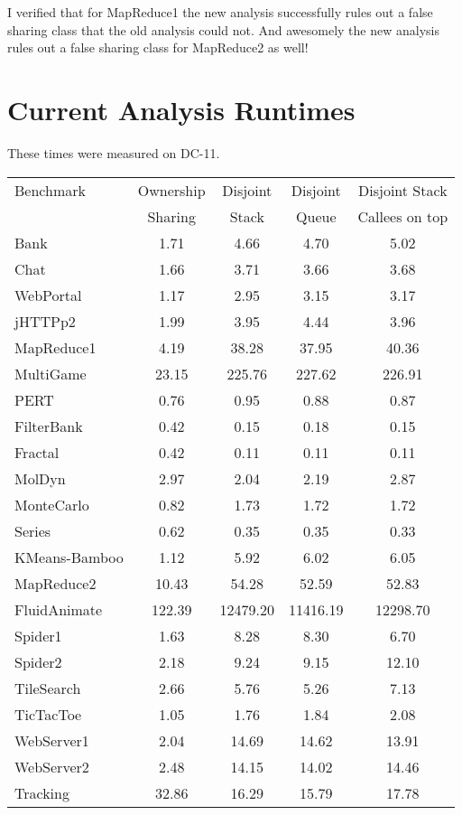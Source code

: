 \documentclass{amsart}[9pt]
\begin{document}
I verified that for MapReduce1 the new analysis successfully rules out
a false sharing class that the old analysis could not.  And awesomely
the new analysis rules out a false sharing class for MapReduce2 as
well!


\newpage

\section{Current Analysis Runtimes}
These times were measured on DC-11.

\begin{tabular}{|l|c|c|c|c|}
\hline
Benchmark     & Ownership & Disjoint & Disjoint & Disjoint Stack \\
              & Sharing   & Stack    & Queue    & Callees on top \\
\hline
Bank          &  1.71   & 4.66     & 4.70     &  5.02           \\
Chat          &  1.66   & 3.71     & 3.66     &  3.68           \\
WebPortal     &  1.17   & 2.95     & 3.15     &  3.17           \\
jHTTPp2       &  1.99   & 3.95     & 4.44     &  3.96           \\
MapReduce1    &  4.19   & 38.28    & 37.95    &  40.36          \\
MultiGame     &  23.15  & 225.76   & 227.62   &  226.91         \\
PERT          &  0.76   & 0.95     & 0.88     &  0.87           \\
FilterBank    &  0.42   & 0.15     & 0.18     &  0.15           \\
Fractal       &  0.42   & 0.11     & 0.11     &  0.11           \\
MolDyn        &  2.97   & 2.04     & 2.19     &  2.87           \\
MonteCarlo    &  0.82   & 1.73     & 1.72     &  1.72           \\
Series        &  0.62   & 0.35     & 0.35     &  0.33           \\
KMeans-Bamboo &  1.12   & 5.92     & 6.02     &  6.05           \\
MapReduce2    &  10.43  & 54.28    & 52.59    &  52.83          \\
FluidAnimate  &  122.39 & 12479.20 & 11416.19 &  12298.70       \\
Spider1       &  1.63   & 8.28     & 8.30     &  6.70           \\
Spider2       &  2.18   & 9.24     & 9.15     &  12.10          \\
TileSearch    &  2.66   & 5.76     & 5.26     &  7.13           \\
TicTacToe     &  1.05   & 1.76     & 1.84     &  2.08           \\
WebServer1    &  2.04   & 14.69    & 14.62    &  13.91          \\
WebServer2    &  2.48   & 14.15    & 14.02    &  14.46          \\
Tracking      &  32.86  & 16.29    & 15.79    &  17.78          \\
\hline
\end{tabular}
\end{document}

